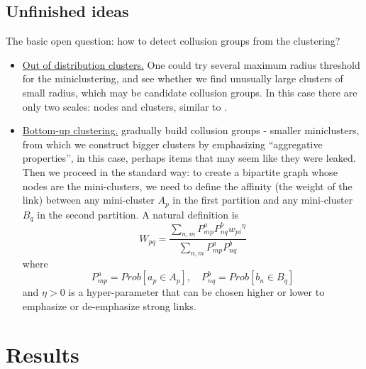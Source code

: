 \documentclass{article}
\begin{document}
\subsection{Unfinished ideas}
The basic open question: how to detect collusion groups from the clustering?
\begin{itemize}
	\item \underline{Out of distribution clusters.} One could try several maximum radius threshold for the miniclustering, and see whether we find unusually large clusters of small radius, which may be candidate collusion groups. In this case there are only two scales: nodes and clusters, similar to \cite{primal}.
  \item \underline{Bottom-up clustering.} gradually build collusion groups - smaller miniclusters, from which we construct bigger clusters by emphasizing ``aggregative properties'', in this case, perhaps items that may seem like they were leaked. Then we proceed in the standard way: to create a bipartite graph whose nodes are the mini-clusters, we need to define  the affinity (the weight of the link) between any mini-cluster $A_p$ in the first partition and any mini-cluster $B_q$ in the second partition. A natural definition is
\begin{equation}
W_{pq} = \frac{\sum_{n,m} P^a_{mp}P^b_{nq}{w_{pi}}^\eta}{ \sum_{n,m}P^a_{mp}P^b_{nq}}
\label{eqn:b2}
\end{equation}
where
\begin{equation}
P^a_{mp} = Prob \left[a_p \in A_p\right], \quad P^b_{nq} = Prob \left[ b_n \in B_q \right]
\end{equation}
and $\eta>0$ is a hyper-parameter that can be chosen higher or lower to emphasize or de-emphasize strong links.
\end{itemize}

\section{Results}
\label{results}
\end{document}
